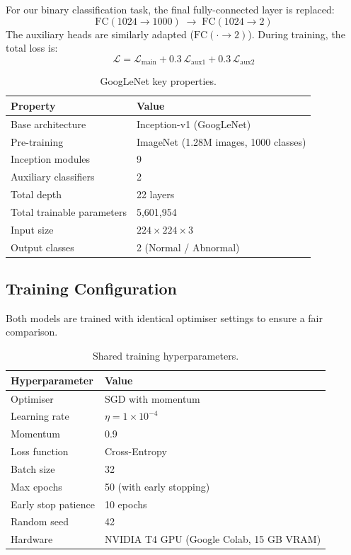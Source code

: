 \documentclass[12pt,a4paper]{article}
\begin{document}
For our binary classification task, the final fully-connected layer is replaced:
\[
    \text{FC}(1024 \rightarrow 1000) \;\longrightarrow\;
    \text{FC}(1024 \rightarrow 2)
\]
The auxiliary heads are similarly adapted ($\text{FC}(\cdot \rightarrow 2)$).
During training, the total loss is:
\begin{equation}
    \mathcal{L} = \mathcal{L}_{\text{main}} +
                  0.3\,\mathcal{L}_{\text{aux1}} +
                  0.3\,\mathcal{L}_{\text{aux2}}
    \label{eq:googleloss}
\end{equation}

\begin{table}[H]
\centering
\caption{GoogLeNet key properties.}
\label{tab:googlenet}
\begin{tabular}{ll}
    \toprule
    \textbf{Property} & \textbf{Value} \\
    \midrule
    Base architecture & Inception-v1 (GoogLeNet) \\
    Pre-training & ImageNet (1.28M images, 1000 classes) \\
    Inception modules & 9 \\
    Auxiliary classifiers & 2 \\
    Total depth & 22 layers \\
    Total trainable parameters & 5,601,954 \\
    Input size & $224{\times}224{\times}3$ \\
    Output classes & 2 (Normal / Abnormal) \\
    \bottomrule
\end{tabular}
\end{table}

\subsection{Training Configuration}

Both models are trained with identical optimiser settings to ensure a fair
comparison.

\begin{table}[H]
\centering
\caption{Shared training hyperparameters.}
\label{tab:hyperparams}
\begin{tabular}{ll}
    \toprule
    \textbf{Hyperparameter} & \textbf{Value} \\
    \midrule
    Optimiser         & SGD with momentum \\
    Learning rate     & $\eta = 1 \times 10^{-4}$ \\
    Momentum          & 0.9 \\
    Loss function     & Cross-Entropy \\
    Batch size        & 32 \\
    Max epochs        & 50 (with early stopping) \\
    Early stop patience & 10 epochs \\
    Random seed       & 42 \\
    Hardware          & NVIDIA T4 GPU (Google Colab, 15 GB VRAM) \\
    \bottomrule
\end{tabular}
\end{table}
\end{document}
